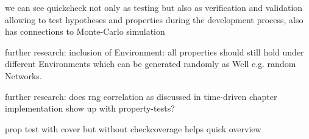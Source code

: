 we can see quickcheck not only as testing but also as verification and validation allowing to test hypotheses and properties during the development process, also has connections to Monte-Carlo simulation

further research: inclusion of Environment: all  properties should still hold under different Environments which can be generated randomly as Well e.g. random Networks.

further research: does rng correlation as discussed in time-driven chapter implementation show up with property-tests?

prop test with cover but without checkcoverage helps quick overview